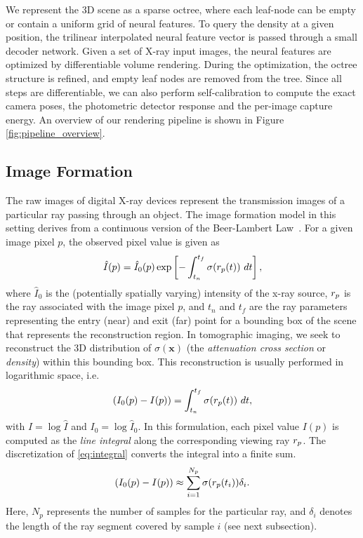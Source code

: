 \documentclass[acmtog,nonacm]{acmart} \acmSubmissionID{0438}
\newcommand{\vvec}[1]{\mathbf{#1}}   \newcommand{\mmat}[1]{\mathbf{\uppercase{#1}}}
\newcommand{\img}{I}          \newcommand{\bgimg}{\img_0}   \newcommand{\oimg}{\hat\img}  \newcommand{\obgimg}{\hat\img_0}  \newcommand{\pix}{p}
\newcommand{\density}{\sigma} \newcommand{\mlp}{\Phi}
\newcommand{\ttt}{t}          \newcommand{\ts}{{t_n}}       \newcommand{\te}{{t_f}}       \newcommand{\x}{\vvec{x}}     \newcommand{\feat}{f}
\begin{document}
We represent the 3D scene as a sparse octree, where each leaf-node can be empty or contain a uniform grid of neural features.
To query the density at a given position, the trilinear interpolated neural feature vector is passed through a small decoder network.
Given a set of X-ray input images, the neural features are optimized by differentiable volume rendering.
During the optimization, the octree structure is refined, and empty leaf nodes are removed from the tree.
Since all steps are differentiable, we can also perform self-calibration to compute the exact camera poses, the photometric detector response and the per-image capture energy.
An overview of our rendering pipeline is shown in Figure \ref{fig:pipeline_overview}.

\subsection{Image Formation}

The raw images of digital X-ray devices represent the transmission
images of a particular ray passing through an object.  The image
formation model in this setting derives from a continuous version of
the Beer-Lambert Law~\cite{kak2001principles}. For a given image pixel
$\pix$, the observed pixel value is given as
\begin{equation}
  \oimg(\pix) = \obgimg(\pix) \exp\left[-\int_{\ts}^{\te}
  \density(\ray_\pix(\ttt))\ d\ttt  \right],
    \label{eq:linspace}
\end{equation}
where $\obgimg$ is the (potentially spatially varying) intensity of
the x-ray source, $\ray_\pix$ is the ray associated with the image pixel
$\pix$, and $\ts$ and $\te$ are the ray parameters representing the
entry (near) and exit (far) point for a bounding box of the scene that
represents the reconstruction region. In tomographic imaging, we seek
to reconstruct the 3D distribution of $\density(\x)$ (the {\em
  attenuation cross section} or {\em density}) within this bounding
box.  This reconstruction is usually performed in logarithmic space,
i.e.
\begin{equation}
  \left(\bgimg(\pix) - \img(\pix)\right) =
  \int_{\ts}^{\te} \density(\ray_\pix(\ttt))\ d\ttt,
\label{eq:integral}
\end{equation}
with $\img= \log\oimg$ and $\bgimg=\log\obgimg$. In this formulation,
each pixel value $\img(\pix)$ is computed as the {\em line integral}
along the corresponding viewing ray $\ray_\pix$.
The discretization of \eqref{eq:integral} converts the integral into a finite sum.
\begin{equation}
(\bgimg(\pix)-\img(\pix)) \approx \sum _{i=1}^{N_p}\density(\ray_\pix(\ttt_i)) \delta_i.
\label{eq:sum}
\end{equation}
Here, $N_p$ represents the number of samples for the particular ray,
and $\delta_i$ denotes the length of the ray segment  covered by
sample $i$ (see next subsection).
\end{document}
